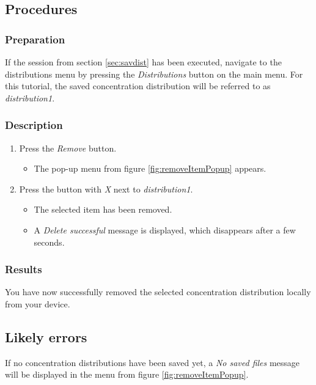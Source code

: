 \subsection{Procedures}

\subsubsection{Preparation}
If the session from section \ref{sec:savdist} has been executed, navigate to the distributions menu by pressing the \emph{Distributions} button on the main menu. 
For this tutorial, the saved concentration distribution will be referred to as \emph{distribution1}.

\subsubsection{Description}
\begin{enumerate}
	\item Press the \emph{Remove} button.
		\begin{itemize}
			\item The pop-up menu from figure \ref{fig:removeItemPopup} appears.
		\end{itemize}
	\item Press the button with \emph{X} next to \emph{distribution1}.
		\begin{itemize}
			\item The selected item has been removed.
			\item A \emph{Delete successful} message is displayed, which disappears after a few seconds.
		\end{itemize}
\end{enumerate}

\subsubsection{Results}
You have now successfully removed the selected concentration distribution locally from your device.

\subsection{Likely errors}
If no concentration distributions have been saved yet, a \emph{No saved files} message will be displayed in the menu from figure \ref{fig:removeItemPopup}.

